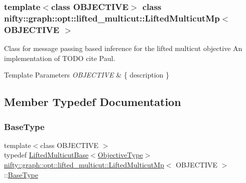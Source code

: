 \subsubsection*{template$<$class O\+B\+J\+E\+C\+T\+I\+VE$>$\newline
class nifty\+::graph\+::opt\+::lifted\+\_\+multicut\+::\+Lifted\+Multicut\+Mp$<$ O\+B\+J\+E\+C\+T\+I\+V\+E $>$}

Class for message passing based inference for the lifted multicut objective An implementation of T\+O\+DO cite Paul. 


\begin{DoxyTemplParams}{Template Parameters}
{\em O\+B\+J\+E\+C\+T\+I\+VE} & \{ description \} \\
\hline
\end{DoxyTemplParams}


\subsection{Member Typedef Documentation}
\mbox{\label{classnifty_1_1graph_1_1opt_1_1lifted__multicut_1_1LiftedMulticutMp_a7e49c98a298643cc17c1732827b64243}} 
\subsubsection{\texorpdfstring{Base\+Type}{BaseType}}
{\footnotesize\ttfamily template$<$class O\+B\+J\+E\+C\+T\+I\+VE $>$ \\
typedef \hyperlink{classnifty_1_1graph_1_1opt_1_1lifted__multicut_1_1LiftedMulticutBase}{Lifted\+Multicut\+Base}$<$\hyperlink{classnifty_1_1graph_1_1opt_1_1lifted__multicut_1_1LiftedMulticutMp_a7946ba353b86ff043eff57fd75513b81}{Objective\+Type}$>$ \hyperlink{classnifty_1_1graph_1_1opt_1_1lifted__multicut_1_1LiftedMulticutMp}{nifty\+::graph\+::opt\+::lifted\+\_\+multicut\+::\+Lifted\+Multicut\+Mp}$<$ O\+B\+J\+E\+C\+T\+I\+VE $>$\+::\hyperlink{classnifty_1_1graph_1_1opt_1_1lifted__multicut_1_1LiftedMulticutMp_a7e49c98a298643cc17c1732827b64243}{Base\+Type}}

\mbox{\label{classnifty_1_1graph_1_1opt_1_1lifted__multicut_1_1LiftedMulticutMp_a001fa87667c60e36d940d411c59fe2d0}} 
